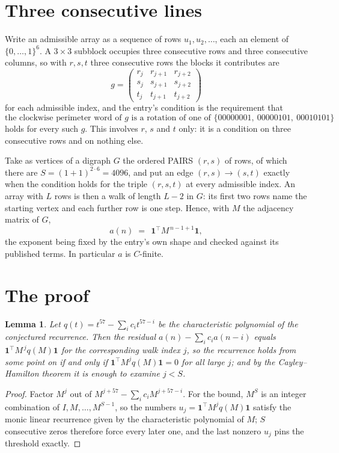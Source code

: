 \documentclass[11pt,a4paper]{article}
\theoremstyle{plain}
\newtheorem{lemma}[theorem]{Lemma}
\theoremstyle{definition}
\begin{document}
\section{Three consecutive lines}

Write an admissible array as a sequence of rows $u_1,u_2,\dots$, each an element of
$\{0,\dots,1\}^{6}$. A $3\times3$ subblock occupies three consecutive rows and
three consecutive columns, so with $r,s,t$ three consecutive rows the blocks it
contributes are
\[
g=\begin{pmatrix}r_j&r_{j+1}&r_{j+2}\\ s_j&s_{j+1}&s_{j+2}\\ t_j&t_{j+1}&t_{j+2}\end{pmatrix}
\]
for each admissible index, and the entry's condition is the requirement that
\[
\text{the clockwise perimeter word of }g\text{ is a rotation of one of }\{00000001,\ 00000101,\ 00010101\}
\]
holds for every such $g$. This involves $r$, $s$ and $t$ only: it is a condition on
three consecutive rows and on nothing else.

Take as vertices of a digraph $G$ the ordered PAIRS $(r,s)$ of rows, of which there are
$S=(1+1)^{2\cdot6}=4096$, and put an edge $(r,s)\to(s,t)$ exactly when the condition
holds for the triple $(r,s,t)$ at every admissible index. An array with $L$ rows is then a
walk of length $L-2$ in $G$: its first two rows name the starting vertex and each further
row is one step. Hence, with $M$ the adjacency matrix of $G$,
\[
a(n)\;=\;\,\mathbf{1}^{\!\top}M^{\,n-1+1}\mathbf{1},
\]
the exponent being fixed by the entry's own shape and checked against its published terms.
In particular $a$ is $C$-finite.

\section{The proof}

\begin{lemma}\label{lem:crit}
Let $q(t)=t^{57}-\sum_i c_it^{57-i}$ be the characteristic polynomial of the
conjectured recurrence. Then the residual $a(n)-\sum_ic_ia(n-i)$ equals
$\mathbf{1}^{\!\top}M^{\,j}q(M)\mathbf{1}$ for the corresponding walk index
$j$, so the recurrence holds from some point on if and only if
$\mathbf{1}^{\!\top}M^{j}q(M)\mathbf{1}=0$ for all large $j$; and by the
Cayley--Hamilton theorem it is enough to examine $j<S$.
\end{lemma}

\begin{proof}
Factor $M^{j}$ out of $M^{j+57}-\sum_ic_iM^{j+57-i}$. For the bound, $M^{S}$
is an integer combination of $I,M,\dots,M^{S-1}$, so the numbers
$u_j=\mathbf{1}^{\!\top}M^{j}q(M)\mathbf{1}$ satisfy the monic linear recurrence given by
the characteristic polynomial of $M$; $S$ consecutive zeros therefore force every later one,
and the last nonzero $u_j$ pins the threshold exactly.
\end{proof}
\end{document}
